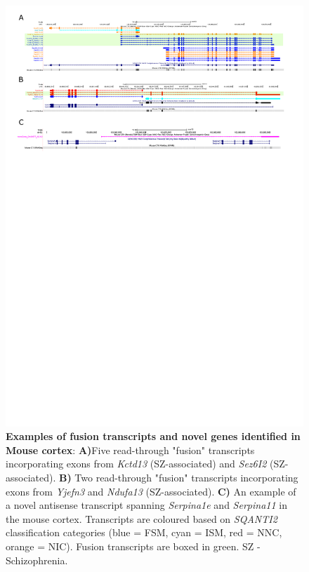 \begin{landscape}
	\begin{figure}[htp]
		\begin{center}
			\includegraphics[page=1,trim={0 20cm 0 0},scale = 1.2]{Figures/FusionNovelGenes.pdf}
		\end{center}
		\vspace{1cm}
		\captionsetup{width=1.5\textwidth}
		\caption[Iso-Seq identifies fusion transcripts and novel genes in Mouse cortex]%
		{\textbf{Examples of fusion transcripts and novel genes identified in Mouse cortex}: \textbf{A)}Five read-through "fusion" transcripts incorporating exons from \textit{Kctd13} (SZ-associated) and \textit{Sez6I2} (SZ-associated). \textbf{B)} Two read-through "fusion" transcripts incorporating exons from \textit{Yjefn3} and \textit{Ndufa13} (SZ-associated). \textbf{C)} An example of a novel antisense transcript spanning \textit{Serpina1e} and \textit{Serpina11} in the mouse cortex. Transcripts are coloured based on \textit{SQANTI2} classification categories (blue = FSM, cyan = ISM, red = NNC, orange = NIC). Fusion transcripts are boxed in green. SZ - Schizophrenia.}   
		\label{fig:isoseq_whole_novelfusion}
	\end{figure}
\end{landscape}



